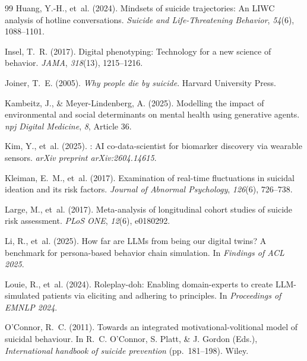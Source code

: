 \documentclass[review,12pt,authoryear]{elsarticle}
\begin{document}
\begin{thebibliography}{99}
Huang, Y.-H., et~al. (2024).
\newblock Mindsets of suicide trajectories: {A}n {LIWC} analysis of hotline conversations.
\newblock \textit{Suicide and Life-Threatening Behavior}, \textit{54}(6), 1088--1101.

Insel, T.~R. (2017).
\newblock Digital phenotyping: {T}echnology for a new science of behavior.
\newblock \textit{JAMA}, \textit{318}(13), 1215--1216.

Joiner, T.~E. (2005).
\newblock \textit{Why people die by suicide}.
\newblock Harvard University Press.

Kambeitz, J., \& Meyer-Lindenberg, A. (2025).
\newblock Modelling the impact of environmental and social determinants on mental health using generative agents.
\newblock \textit{npj Digital Medicine}, \textit{8}, Article 36.

Kim, Y., et~al. (2025).
: {AI} co-data-scientist for biomarker discovery via wearable sensors.
\newblock \textit{arXiv preprint arXiv:2604.14615}.

Kleiman, E.~M., et~al. (2017).
\newblock Examination of real-time fluctuations in suicidal ideation and its risk factors.
\newblock \textit{Journal of Abnormal Psychology}, \textit{126}(6), 726--738.

Large, M., et~al. (2017).
\newblock Meta-analysis of longitudinal cohort studies of suicide risk assessment.
\newblock \textit{PLoS ONE}, \textit{12}(6), e0180292.


Li, R., et~al. (2025).
\newblock How far are {LLMs} from being our digital twins? {A} benchmark for persona-based behavior chain simulation.
\newblock In \textit{Findings of ACL 2025}.

Louie, R., et~al. (2024).
\newblock Roleplay-doh: {E}nabling domain-experts to create {LLM}-simulated patients via eliciting and adhering to principles.
\newblock In \textit{Proceedings of EMNLP 2024}.

O'Connor, R.~C. (2011).
\newblock Towards an integrated motivational-volitional model of suicidal behaviour.
\newblock In R.~C. O'Connor, S. Platt, \& J. Gordon (Eds.), \textit{International handbook of suicide prevention} (pp.\ 181--198). Wiley.


\end{thebibliography}
\end{document}
